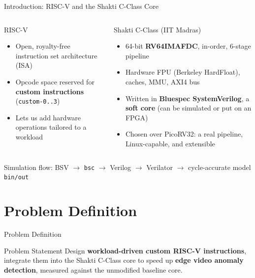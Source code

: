 \documentclass[aspectratio=169,11pt]{beamer}
\begin{document}
\begin{frame}{Introduction: RISC-V and the Shakti C-Class Core}
  \begin{columns}[T]
    \begin{block}{RISC-V}
      \begin{itemize}
        \item Open, royalty-free instruction set architecture (ISA)
        \item Opcode space reserved for \textbf{custom instructions}
              (\texttt{custom-0..3})
        \item Lets us add hardware operations tailored to a workload
      \end{itemize}
    \end{block}
    \begin{block}{Shakti C-Class (IIT Madras)}
      \begin{itemize}
        \item 64-bit \textbf{RV64IMAFDC}, in-order, 6-stage pipeline
        \item Hardware FPU (Berkeley HardFloat), caches, MMU, AXI4 bus
        \item Written in \textbf{Bluespec SystemVerilog}, a \textbf{soft core}
              (can be simulated or put on an FPGA)
        \item Chosen over PicoRV32: a real pipeline, Linux-capable,
              and extensible
      \end{itemize}
    \end{block}
  \end{columns}
  \vspace{2mm}
  \centering\small Simulation flow: BSV $\rightarrow$ \texttt{bsc} $\rightarrow$
  Verilog $\rightarrow$ Verilator $\rightarrow$ cycle-accurate model \texttt{bin/out}
\end{frame}

\section{Problem Definition}
\begin{frame}{Problem Definition}
  \vfill
  \begin{block}{Problem Statement}
    \large
    Design \textbf{workload-driven custom RISC-V instructions}, integrate them into
    the Shakti C-Class core to speed up \textbf{edge video anomaly detection},
    measured against the unmodified baseline core.
  \end{block}
  \vfill
\end{frame}
\end{document}

